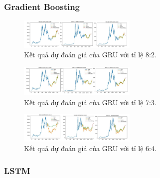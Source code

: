\documentclass[conference]{IEEEtran}
\begin{document}
\subsubsection{Gradient Boosting}

\begin{figure}[H]
    \centering
    \includegraphics[width=0.5\textwidth]{bibliography/pictures/GRU_82.jpg}
    \caption{Kết quả dự đoán giá của GRU với tỉ lệ 8:2.}
\end{figure}
\begin{figure}[H]
    \centering
    \includegraphics[width=0.5\textwidth]{bibliography/pictures/GRU_73.jpg}
    \caption{Kết quả dự đoán giá của GRU với tỉ lệ 7:3.}
\end{figure}
\begin{figure}[H]
    \centering
    \includegraphics[width=0.5\textwidth]{bibliography/pictures/GRU_64.jpg}
    \caption{Kết quả dự đoán giá của GRU với tỉ lệ 6:4.}
\end{figure}

\subsubsection{LSTM}
\end{document}
